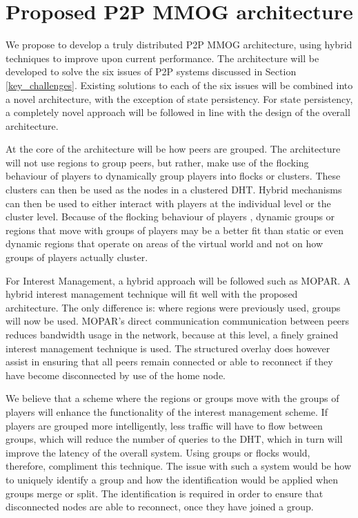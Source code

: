 \documentclass[journal,oneside,a4paper,onecolumn]{IEEEtran}
\begin{document}
\section{Proposed P2P MMOG architecture}
\label{proposed_architecture}

We propose to develop a truly distributed P2P MMOG architecture, using hybrid techniques to improve upon current performance. The architecture will be developed to solve the six issues of P2P systems discussed in Section \ref{key_challenges}. Existing solutions to each of the six issues will be combined into a novel architecture, with the exception of state persistency. For state persistency, a completely novel approach will be followed in line with the design of the overall architecture.

At the core of the architecture will be how peers are grouped. The architecture will not use regions to group peers, but rather, make use of the flocking behaviour of players to dynamically group players into flocks or clusters. These clusters can then be used as the nodes in a clustered \ac{DHT}. Hybrid mechanisms can then be used to either interact with players at the individual level or the cluster level. Because of the flocking behaviour of players \cite{flocking}, dynamic groups or regions that move with groups of players may be a better fit than static or even dynamic regions that operate on areas of the virtual world and not on how groups of players actually cluster.

For Interest Management, a hybrid approach will be followed such as MOPAR. A hybrid interest management technique will fit well with the proposed architecture. The only difference is: where regions were previously used, groups will now be used. MOPAR's direct communication communication between peers reduces bandwidth usage in the network, because at this level, a finely grained interest management technique is used. The structured overlay does however assist in ensuring that all peers remain connected or able to reconnect if they have become disconnected by use of the home node.

We believe that a scheme where the regions or groups move with the groups of players will enhance the functionality of the interest management scheme. If players are grouped more intelligently, less traffic will have to flow between groups, which will reduce the number of queries to the DHT, which in turn will improve the latency of the overall system. Using groups or flocks would, therefore, compliment this technique. The issue with such a system would be how to uniquely identify a group and how the identification would be applied when groups merge or split. The identification is required in order to ensure that disconnected nodes are able to reconnect, once they have joined a group.
\end{document}
